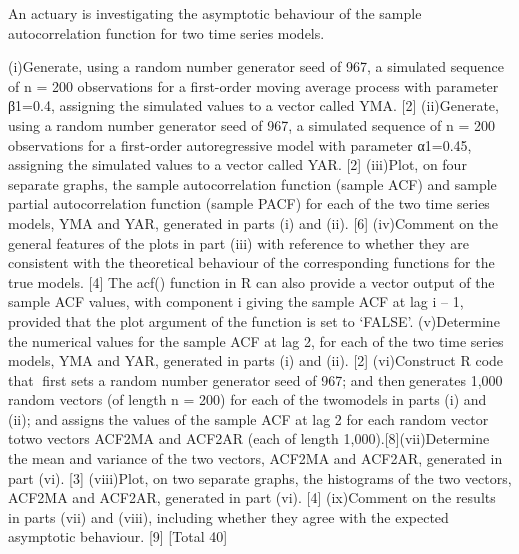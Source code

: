 \documentclass[a4paper,12pt]{article}
\begin{document}
\large 
\noindent An actuary is investigating the asymptotic behaviour of the sample autocorrelation function for two time series models. 


(i)Generate, using a random number generator seed of 967, a simulated sequence of n = 200 observations for a first-order moving average process with parameter β1=0.4, assigning the simulated values to a vector called YMA.  [2] (ii)Generate, using a random number generator seed of 967, a simulated sequence of n = 200 observations for a first-order autoregressive model with parameter α1=0.45, assigning the simulated values to a vector called YAR. [2] (iii)Plot, on four separate graphs, the sample autocorrelation function (sample ACF) and sample partial autocorrelation function (sample PACF) for each of the two time series models, YMA and YAR, generated in parts (i) and (ii).   [6] (iv)Comment on the general features of the plots in part (iii) with reference to whether they are consistent with the theoretical behaviour of the corresponding functions for the true models. [4] The acf() function in R can also provide a vector output of the sample ACF values, with component i giving the sample ACF at lag i – 1, provided that the plot argument of the function is set to ‘FALSE’.  (v)Determine the numerical values for the sample ACF at lag 2, for each of the two time series models, YMA and YAR, generated in parts (i) and (ii). [2] (vi)Construct R code that  first sets a random number generator seed of 967; and thengenerates 1,000 random vectors (of length n = 200) for each of the twomodels in parts (i) and (ii); andassigns the values of the sample ACF at lag 2 for each random vector totwo vectors ACF2MA and ACF2AR (each of length 1,000).[8](vii)Determine the mean and variance of the two vectors, ACF2MA and ACF2AR, generated in part (vi). [3] (viii)Plot, on two separate graphs, the histograms of the two vectors, ACF2MA and ACF2AR, generated in part (vi). [4] (ix)Comment on the results in parts (vii) and (viii), including whether they agree with the expected asymptotic behaviour. [9] [Total 40] 
\end{document}
